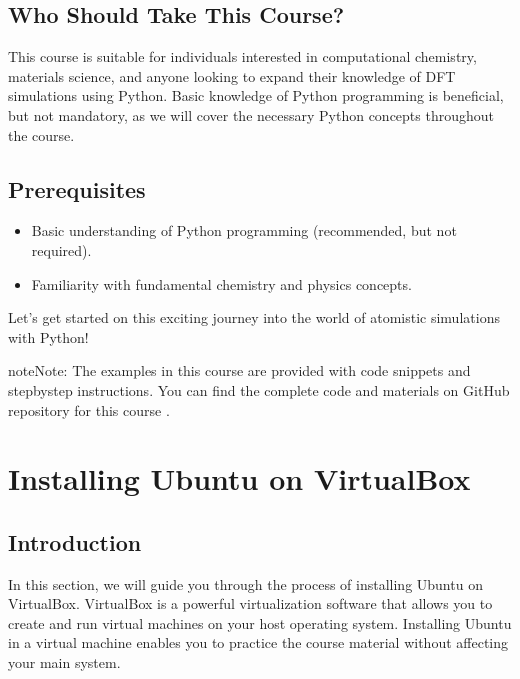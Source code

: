 \documentclass[letterpaper,10pt,english]{sphinxmanual}
\begin{document}
\section{Who Should Take This Course?}
\label{\detokenize{introduction:who-should-take-this-course}}
\sphinxAtStartPar
This course is suitable for individuals interested in computational chemistry, materials science, and anyone looking to expand their knowledge of DFT simulations using Python. Basic knowledge of Python programming is beneficial, but not mandatory, as we will cover the necessary Python concepts throughout the course.


\section{Prerequisites}
\label{\detokenize{introduction:prerequisites}}\begin{itemize}
\item {} 
\sphinxAtStartPar
Basic understanding of Python programming (recommended, but not required).

\item {} 
\sphinxAtStartPar
Familiarity with fundamental chemistry and physics concepts.

\end{itemize}

\sphinxAtStartPar
Let’s get started on this exciting journey into the world of atomistic simulations with Python!

\begin{sphinxadmonition}{note}{Note:}
\sphinxAtStartPar
The examples in this course are provided with code snippets and step\sphinxhyphen{}by\sphinxhyphen{}step instructions. You can find the complete code and materials on GitHub repository for this course  .
\end{sphinxadmonition}

\sphinxstepscope


\chapter{Installing Ubuntu on VirtualBox}
\label{\detokenize{vbox/vbox:installing-ubuntu-on-virtualbox}}\label{\detokenize{vbox/vbox::doc}}

\section{Introduction}
\label{\detokenize{vbox/vbox:introduction}}
\sphinxAtStartPar
In this section, we will guide you through the process of installing Ubuntu on VirtualBox. VirtualBox is a powerful virtualization software that allows you to create and run virtual machines on your host operating system. Installing Ubuntu in a virtual machine enables you to practice the course material without affecting your main system.
\end{document}
